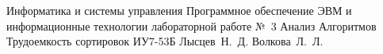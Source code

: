 \documentclass{bmstu}
\begin{document}
\makereporttitle
{Информатика и системы управления} %
{Программное обеспечение ЭВМ и информационные технологии}
{лабораторной работе №~3} %
{Анализ Алгоритмов} %
{Трудоемкость сортировок} %
{} %
{ИУ7-53Б} %
{Лысцев~Н.~Д.} %
{Волкова~Л.~Л.}

\maketableofcontents






%

\makebibliography
\end{document}
